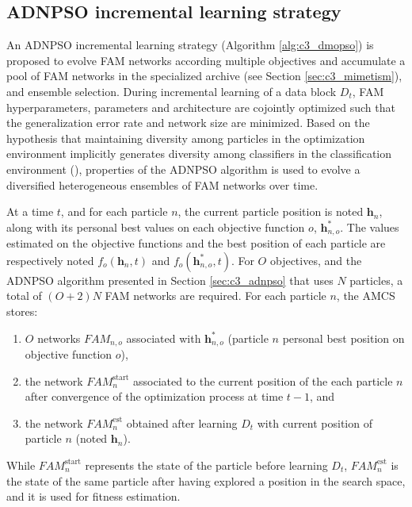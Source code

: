 \subsection{ADNPSO incremental learning strategy}
\label{sec:c3_strategy}

An ADNPSO incremental learning strategy (Algorithm \ref{alg:c3_dmopso}) is proposed to evolve FAM networks according multiple objectives and accumulate a pool of FAM networks in the specialized archive (see Section \ref{sec:c3_mimetism}), and ensemble selection.
During incremental learning of a data block $D_t$, FAM hyperparameters, parameters and architecture are cojointly optimized such that the generalization error rate and network size are minimized.
Based on the hypothesis that maintaining diversity among particles in the optimization environment implicitly generates diversity among classifiers in the classification environment (\cite{connolly11}), properties of the ADNPSO algorithm is used to evolve a diversified heterogeneous ensembles of FAM networks over time.

At a time $t$, and for each particle $n$, the current particle position is noted $\textbf{h}_n$, along with its personal best values on each objective function $o$, $\textbf{h}^*_{n,o}$.
The values estimated on the objective functions and the best position of each particle are respectively noted $f_o(\textbf{h}_n,t)$ and $f_o(\textbf{h}^*_{n,o},t)$. 
For $O$ objectives, and the ADNPSO algorithm presented in Section \ref{sec:c3_adnpso} that uses $N$ particles, a total of $(O+2)N$ FAM networks are required.
For each particle $n$, the AMCS stores:
\begin{enumerate}
	\item $O$ networks $\textit{FAM}_{n,o}$ associated with $\textbf{h}^*_{n,o}$ (particle $n$ personal best position on objective function $o$),
	\item the network $\textit{FAM}_n^\text{start}$ associated to the current position of the each particle $n$ after convergence of the optimization process at time $t-1$, and 
	\item the network $\textit{FAM}_n^\text{est}$ obtained after learning $D_t$ with current position of particle $n$ (noted $\textbf{h}_n$).
\end{enumerate}
While $\textit{FAM}_n^\text{start}$ represents the state of the particle before learning $D_t$, $\textit{FAM}_n^\text{est}$ is the state of the same particle after having explored a position in the search space, and it is used for fitness estimation.

